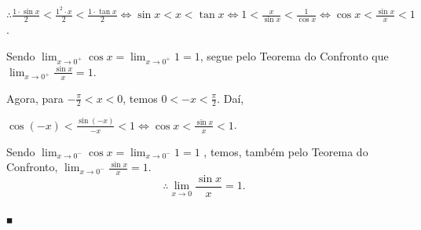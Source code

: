 \documentclass{article}
\begin{document}
{\begin{newpage}
\begin{figure}[htbp]
\begin{center}
\end{center}
\end{figure}
\par
\vspace{0.3cm}
\begin{center} $\therefore\displaystyle{\frac{1\cdot\sin{x}}{2}<\frac{1^2\cdot x}{2}<\frac{1\cdot\tan{x}}{2}\Leftrightarrow\sin{x}<x<\tan{x}\Leftrightarrow 1<\frac{x}{\sin{x}}<\frac{1}{\cos{x}}\Leftrightarrow \cos{x}<\frac{\sin{x}}{x}}<1$.\end{center}
\par
\vspace{0.3cm}
Sendo $\displaystyle{\lim_{x\to 0^{+}} \cos{x} = \lim_{x\to 0^{+}} 1 = 1}$, segue pelo Teorema do Confronto que $\displaystyle{\lim_{x\to 0^{+}}} \frac{\sin{x}}{x} = 1$.
\par
\vspace{0.3cm}
Agora, para $\displaystyle{-\frac{\pi }{2}<x<0}$, temos $\displaystyle{0<-x<\frac{\pi }{2}}$. Daí,
\par
\vspace{0.3cm}
\begin{center}$\cos{(-x)}<\displaystyle{\frac{\sin{(-x)}}{-x}<1\Leftrightarrow \cos{x}<\frac{\sin{x}}{x}<1}$.\end{center}
\par
\vspace{0.3cm}
Sendo $\displaystyle{\lim_{x\to 0^{-}} \cos{x}=\lim_{x\to 0^{-}} 1 = 1}$ , temos, também pelo Teorema do Confronto, $\displaystyle{\lim_{x\to 0^{-}} \frac{\sin{x}}{x}} = 1$.
$$\therefore \displaystyle{\lim_{x\to 0}} \displaystyle{\frac{\sin{x}}{x}} = 1.$$ \begin{flushright} $_{\blacksquare }$ \end{flushright}
\par
\vspace{0.3cm}

\end{newpage}}
\end{document}
